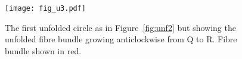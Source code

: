 %

\begin{figure}[!h]
  \centering
  \texttt{[image: fig\_u3.pdf]}
  \caption{The first unfolded circle as in Figure~\ref{fig:unf2} but showing the unfolded fibre bundle growing anticlockwise from Q to R. Fibre bundle shown in red.}
  \label{fig:unf3}
\end{figure}

%

